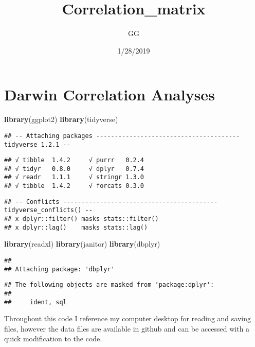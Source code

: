 \documentclass[]{article}
\title{Correlation\_matrix}
\author{GG}
\date{1/28/2019}
\newenvironment{Shaded}{\begin{snugshade}}{\end{snugshade}}
\newcommand{\KeywordTok}[1]{\textcolor[rgb]{0.13,0.29,0.53}{\textbf{#1}}}
\newcommand{\NormalTok}[1]{#1}
\begin{document}
\maketitle

\section{Darwin Correlation Analyses}\label{darwin-correlation-analyses}

\begin{Shaded}
\begin{Highlighting}[]
\KeywordTok{library}\NormalTok{(ggplot2)}
\KeywordTok{library}\NormalTok{(tidyverse)}
\end{Highlighting}
\end{Shaded}

\begin{verbatim}
## -- Attaching packages --------------------------------------- tidyverse 1.2.1 --
\end{verbatim}

\begin{verbatim}
## √ tibble  1.4.2     √ purrr   0.2.4
## √ tidyr   0.8.0     √ dplyr   0.7.4
## √ readr   1.1.1     √ stringr 1.3.0
## √ tibble  1.4.2     √ forcats 0.3.0
\end{verbatim}

\begin{verbatim}
## -- Conflicts ------------------------------------------ tidyverse_conflicts() --
## x dplyr::filter() masks stats::filter()
## x dplyr::lag()    masks stats::lag()
\end{verbatim}

\begin{Shaded}
\begin{Highlighting}[]
\KeywordTok{library}\NormalTok{(readxl)}
\KeywordTok{library}\NormalTok{(janitor)}
\KeywordTok{library}\NormalTok{(dbplyr)}
\end{Highlighting}
\end{Shaded}

\begin{verbatim}
## 
## Attaching package: 'dbplyr'
\end{verbatim}

\begin{verbatim}
## The following objects are masked from 'package:dplyr':
## 
##     ident, sql
\end{verbatim}

Throughout this code I reference my computer desktop for reading and
saving files, however the data files are available in github and can be
accessed with a quick modification to the code.
\end{document}
